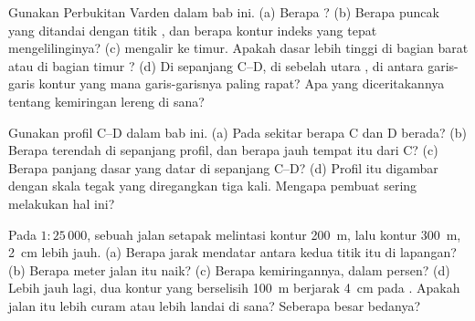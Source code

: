 \begin{exercise}[$\star\star$]\label{exo:g9:maps-of-the-earth:6}
Gunakan  Perbukitan Varden dalam bab ini. (a) Berapa
? (b) Berapa  puncak yang ditandai dengan
titik , dan berapa  kontur indeks yang tepat
mengelilinginya? (c)  mengalir ke timur. Apakah dasar  lebih
tinggi di bagian barat atau di bagian timur ? (d) Di sepanjang C--D,
di sebelah utara , di antara garis-garis kontur yang mana
garis-garisnya paling rapat? Apa yang diceritakannya tentang kemiringan
lereng di sana?
\end{exercise}

\begin{exercise}[$\star\star$]\label{exo:g9:maps-of-the-earth:7}
Gunakan profil C--D dalam bab ini. (a) Pada  sekitar berapa C
dan D berada? (b) Berapa  terendah di sepanjang profil, dan
berapa jauh tempat itu dari C? (c) Berapa panjang dasar  yang datar
di sepanjang C--D? (d) Profil itu digambar dengan skala tegak yang
diregangkan tiga kali. Mengapa pembuat  sering melakukan hal ini?
\end{exercise}

\begin{exercise}[$\star\star$]\label{exo:g9:maps-of-the-earth:8}
Pada  $1 : 25\,000$, sebuah jalan setapak melintasi kontur
\qty{200}{m}, lalu kontur \qty{300}{m}, \qty{2}{cm} lebih jauh. (a) Berapa
jarak mendatar antara kedua titik itu di lapangan? (b) Berapa meter jalan
itu naik? (c) Berapa kemiringannya, dalam persen? (d) Lebih jauh lagi,
dua kontur yang  berselisih \qty{100}{m} berjarak \qty{4}{cm}
pada . Apakah jalan itu lebih curam atau lebih landai di sana? Seberapa
besar bedanya?
\end{exercise}

